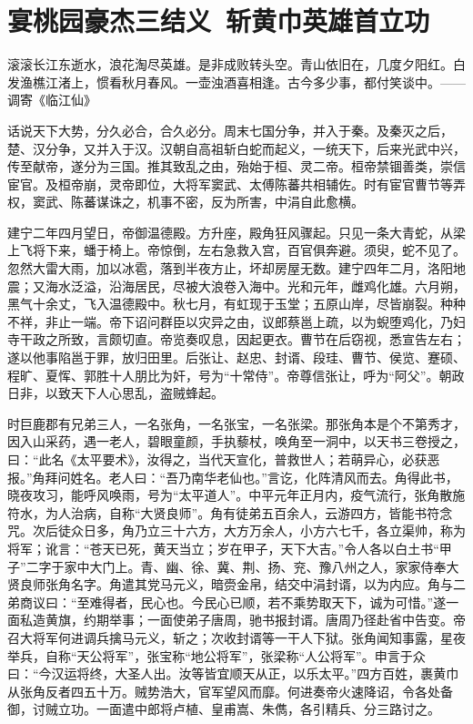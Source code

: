\chapter{宴桃园豪杰三结义~斩黄巾英雄首立功}

滚滚长江东逝水，浪花淘尽英雄。是非成败转头空。青山依旧在，几度夕阳红。白发渔樵江渚上，惯看秋月春风。一壶浊酒喜相逢。古今多少事，都付笑谈中。——调寄《临江仙》

话说天下大势，分久必合，合久必分。周末七国分争，并入于秦。及秦灭之后，楚、汉分争，又并入于汉。汉朝自高祖斩白蛇而起义，一统天下，后来光武中兴，传至献帝，遂分为三国。推其致乱之由，殆始于桓、灵二帝。桓帝禁锢善类，崇信宦官。及桓帝崩，灵帝即位，大将军窦武、太傅陈蕃共相辅佐。时有宦官曹节等弄权，窦武、陈蕃谋诛之，机事不密，反为所害，中涓自此愈横。

建宁二年四月望日，帝御温德殿。方升座，殿角狂风骤起。只见一条大青蛇，从梁上飞将下来，蟠于椅上。帝惊倒，左右急救入宫，百官俱奔避。须臾，蛇不见了。忽然大雷大雨，加以冰雹，落到半夜方止，坏却房屋无数。建宁四年二月，洛阳地震；又海水泛溢，沿海居民，尽被大浪卷入海中。光和元年，雌鸡化雄。六月朔，黑气十余丈，飞入温德殿中。秋七月，有虹现于玉堂；五原山岸，尽皆崩裂。种种不祥，非止一端。帝下诏问群臣以灾异之由，议郎蔡邕上疏，以为蜺堕鸡化，乃妇寺干政之所致，言颇切直。帝览奏叹息，因起更衣。曹节在后窃视，悉宣告左右；遂以他事陷邕于罪，放归田里。后张让、赵忠、封谞、段珪、曹节、侯览、蹇硕、程旷、夏恽、郭胜十人朋比为奸，号为“十常侍”。帝尊信张让，呼为“阿父”。朝政日非，以致天下人心思乱，盗贼蜂起。

时巨鹿郡有兄弟三人，一名张角，一名张宝，一名张梁。那张角本是个不第秀才，因入山采药，遇一老人，碧眼童颜，手执藜杖，唤角至一洞中，以天书三卷授之，曰：“此名《太平要术》，汝得之，当代天宣化，普救世人；若萌异心，必获恶报。”角拜问姓名。老人曰：“吾乃南华老仙也。”言讫，化阵清风而去。角得此书，晓夜攻习，能呼风唤雨，号为“太平道人”。中平元年正月内，疫气流行，张角散施符水，为人治病，自称“大贤良师”。角有徒弟五百余人，云游四方，皆能书符念咒。次后徒众日多，角乃立三十六方，大方万余人，小方六七千，各立渠帅，称为将军；讹言：“苍天已死，黄天当立；岁在甲子，天下大吉。”令人各以白土书“甲子”二字于家中大门上。青、幽、徐、冀、荆、扬、兖、豫八州之人，家家侍奉大贤良师张角名字。角遣其党马元义，暗赍金帛，结交中涓封谞，以为内应。角与二弟商议曰：“至难得者，民心也。今民心已顺，若不乘势取天下，诚为可惜。”遂一面私造黄旗，约期举事；一面使弟子唐周，驰书报封谞。唐周乃径赴省中告变。帝召大将军何进调兵擒马元义，斩之；次收封谞等一干人下狱。张角闻知事露，星夜举兵，自称“天公将军”，张宝称“地公将军”，张梁称“人公将军”。申言于众曰：“今汉运将终，大圣人出。汝等皆宜顺天从正，以乐太平。”四方百姓，裹黄巾从张角反者四五十万。贼势浩大，官军望风而靡。何进奏帝火速降诏，令各处备御，讨贼立功。一面遣中郎将卢植、皇甫嵩、朱儁，各引精兵、分三路讨之。


